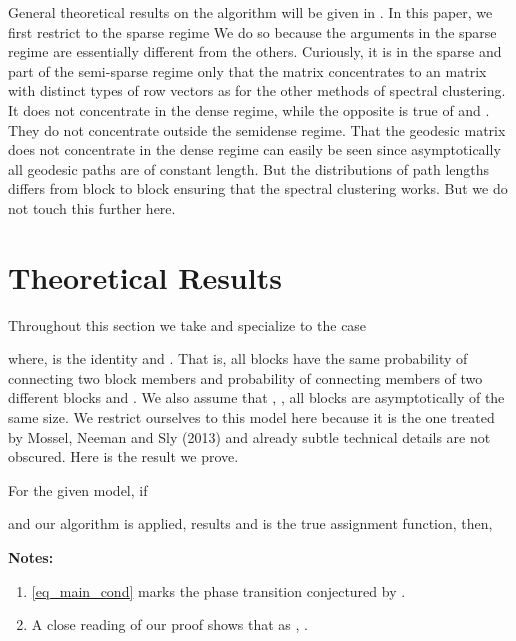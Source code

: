 \documentclass[graybox]{svmult}
\begin{document}
General theoretical results on the algorithm will be given in \cite{bhattacharyya2014community}. In this paper, we first restrict to the sparse regime 
We do so because the arguments in the sparse regime are essentially different from the others. Curiously, it is in the sparse and part of the semi-sparse regime only that the matrix  concentrates to an  matrix with  distinct types of row vectors as for the other methods of spectral clustering. It does not concentrate in the dense regime, while the opposite is true of  and . They do not concentrate outside the semidense regime. That the geodesic matrix does not concentrate in the dense regime can easily be seen since asymptotically all geodesic paths are of constant length. But the distributions of path lengths differs from block to block ensuring that the spectral clustering works. But we do not touch this further here.



\section{Theoretical Results}
\label{sec_geo_theory}


Throughout this section we take  and specialize to the case 

where,  is the identity and . That is, all  blocks have the same probability  of connecting two block members and probability  of connecting members of two different blocks and . We also assume that , , all blocks are asymptotically of the same size. 
We restrict ourselves to this model here because it is the one treated by Mossel, Neeman and Sly (2013) \cite{mossel2013proof} and already subtle technical details are not obscured. Here is the result we prove.
\begin{theorem}
\label{thm_mis}
For the given model, if

and our algorithm is applied,  results and  is the true assignment function, then, 

\end{theorem}
\textbf{Notes:} \begin{enumerate}
\item \eqref{eq_main_cond} marks the phase transition conjectured by \cite{decelle2011asymptotic}.
\item A close reading of our proof shows that as , .
\end{enumerate}
\end{document}
